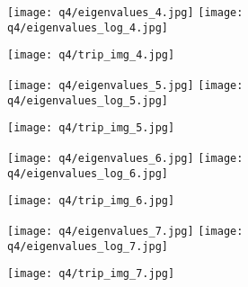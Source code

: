 \documentclass[11pt, fleqn]{article}
\begin{document}
\newpage
\begin{figure}[H]
    \begin{floatrow}
        \ffigbox[0.45\textwidth]{}
        {\texttt{[image: q4/eigenvalues\_4.jpg]}}
        \ffigbox[0.45\textwidth]{}
        {\texttt{[image: q4/eigenvalues\_log\_4.jpg]}}
    \end{floatrow}
    \vspace{1em}
    \begin{floatrow}
        \ffigbox[0.9\textwidth]{}
        {\texttt{[image: q4/trip\_img\_4.jpg]}}
    \end{floatrow}
\end{figure}
\newpage
\begin{figure}[H]
    \begin{floatrow}
        \ffigbox[0.45\textwidth]{}
        {\texttt{[image: q4/eigenvalues\_5.jpg]}}
        \ffigbox[0.45\textwidth]{}
        {\texttt{[image: q4/eigenvalues\_log\_5.jpg]}}
    \end{floatrow}
    \vspace{1em}
    \begin{floatrow}
        \ffigbox[0.9\textwidth]{}
        {\texttt{[image: q4/trip\_img\_5.jpg]}}
    \end{floatrow}
\end{figure}
\newpage
\begin{figure}[H]
    \begin{floatrow}
        \ffigbox[0.45\textwidth]{}
        {\texttt{[image: q4/eigenvalues\_6.jpg]}}
        \ffigbox[0.45\textwidth]{}
        {\texttt{[image: q4/eigenvalues\_log\_6.jpg]}}
    \end{floatrow}
    \vspace{1em}
    \begin{floatrow}
        \ffigbox[0.9\textwidth]{}
        {\texttt{[image: q4/trip\_img\_6.jpg]}}
    \end{floatrow}
\end{figure}
\newpage
\begin{figure}[H]
    \begin{floatrow}
        \ffigbox[0.45\textwidth]{}
        {\texttt{[image: q4/eigenvalues\_7.jpg]}}
        \ffigbox[0.45\textwidth]{}
        {\texttt{[image: q4/eigenvalues\_log\_7.jpg]}}
    \end{floatrow}
    \vspace{1em}
    \begin{floatrow}
        \ffigbox[0.9\textwidth]{}
        {\texttt{[image: q4/trip\_img\_7.jpg]}}
    \end{floatrow}
\end{figure}
\end{document}
